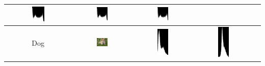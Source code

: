 \documentclass[12pt,a4paper]{article}
\begin{document}
\begin{center}
\begin{longtable}{|c|c|c|c|c|}
       \includegraphics[width=0.2\textwidth]{./latexSource/woman_B_HIS.png} & 
       \includegraphics[width=0.2\textwidth]{./latexSource/woman_G_HIS.png} & 
       \includegraphics[width=0.2\textwidth]{./latexSource/woman_R_HIS.png} \\
\hline
Dog & \includegraphics[width=0.2\textwidth]{./latexSource/dog_origin.png} & 
       \includegraphics[width=0.2\textwidth]{./latexSource/dog_B_HIS.png} & 
       \includegraphics[width=0.2\textwidth]{./latexSource/dog_G_HIS.png} & 

\end{longtable}
\end{center}
\end{document}
